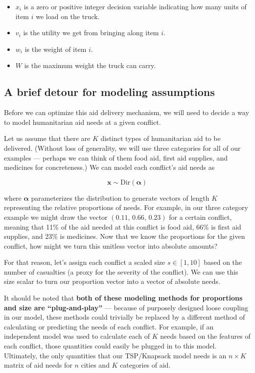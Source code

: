 \documentclass{article} %
\begin{document}
\begin{itemize}
  \item $x_{i}$ is a zero or positive integer decision variable indicating how many units of item $i$
        we load on the truck.
  \item $v_i$ is the utility we get from bringing along item $i$.
  \item $w_i$ is the weight of item $i$.
  \item $W$ is the maximum weight the truck can carry.
\end{itemize}

\subsection{A brief detour for modeling assumptions}

Before we can optimize this aid delivery mechanism, we will need to decide a way to model humanitarian aid needs at a given conflict.

Let us assume that there are $K$ distinct types of humanitarian aid to be delivered. (Without loss of generality, we will use three categories for all of our examples --- perhaps we can think of them food aid, first aid supplies, and medicines for concreteness.) We can model each conflict's aid needs as

$$\boldsymbol x \sim \mathrm{Dir}(\boldsymbol \alpha)$$

where $\boldsymbol \alpha$ parameterizes the distribution to generate vectors of length $K$ representing the relative proportions of needs.\cite{Murphy} For example, in our three category example we might draw the vector $(0.11,\,0.66,\,0.23)$ for a certain conflict, meaning that 11\% of the aid needed at this conflict is food aid, 66\% is first aid supplies, and 23\% is medicines. Now that we know the proportions for the given conflict, how might we turn this unitless vector into absolute amounts?

For that reason, let's assign each conflict a scaled size $s \in [1, 10]$ based on the number of casualties (a proxy for the severity of the conflict). We can use this size scalar to turn our proportion vector into a vector of absolute needs.

It should be noted that \textbf{both of these modeling methods for proportions and size are ``plug-and-play''} --- because of purposely designed loose coupling in our model, these methods could trivially be replaced by a different method of calculating or predicting the needs of each conflict. For example, if an independent model was used to calculate each of $K$ needs based on the features of each conflict, those quantities could easily be plugged in to this model. Ultimately, the only quantities that our TSP/Knapsack model needs is an $n \times K$ matrix of aid needs for $n$ cities and $K$ categories of aid.
\end{document}
